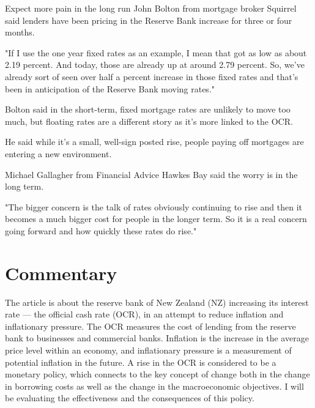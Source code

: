 \documentclass[a4paper,12pt]{article}
\begin{document}
Expect more pain in the long run
John Bolton from mortgage broker Squirrel said lenders have been pricing in the Reserve Bank increase for three or four months.

"If I use the one year fixed rates as an example, I mean that got as low as about 2.19 percent. And today, those are already up at around 2.79 percent. So, we've already sort of seen over half a percent increase in those fixed rates and that's been in anticipation of the Reserve Bank moving rates."

Bolton said in the short-term, fixed mortgage rates are unlikely to move too much, but floating rates are a different story as it's more linked to the OCR.

He said while it's a small, well-sign posted rise, people paying off mortgages are entering a new environment.

Michael Gallagher from Financial Advice Hawkes Bay said the worry is in the long term.

"The bigger concern is the talk of rates obviously continuing to rise and then it becomes a much bigger cost for people in the longer term. So it is a real concern going forward and how quickly these rates do rise."

\newpage

\section*{Commentary}

The article is about the reserve bank of New Zealand (NZ) increasing its interest rate --- the official cash rate (OCR), in an attempt to reduce inflation and inflationary pressure. The OCR measures the cost of lending from the reserve bank to businesses and commercial banks. Inflation is the increase in the average price level within an economy, and inflationary pressure is a measurement of potential inflation in the future. A rise in the OCR is considered to be a monetary policy, which connects to the key concept of change both in the change in borrowing costs as well as the change in the macroeconomic objectives. I will be evaluating the effectiveness and the consequences of this policy.
\end{document}
